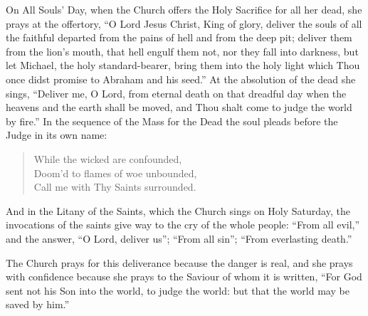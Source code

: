 On All Souls' Day, when the Church offers the Holy Sacrifice for all her dead, she prays at the offertory, ``O Lord Jesus Christ, King of glory, deliver the souls of all the faithful departed from the pains of hell and from the deep pit; deliver them from the lion's mouth, that hell engulf them not, nor they fall into darkness, but let Michael, the holy standard-bearer, bring them into the holy light which Thou once didst promise to Abraham and his seed.'' At the absolution of the dead she sings, ``Deliver me, O Lord, from eternal death on that dreadful day when the heavens and the earth shall be moved, and Thou shalt come to judge the world by fire.'' In the sequence of the Mass for the Dead the soul pleads before the Judge in its own name:

\begin{quote}

\medskip
While the wicked are confounded,\\
Doom'd to flames of woe unbounded,\\
Call me with Thy Saints surrounded.
\end{quote}

\noindent And in the Litany of the Saints, which the Church sings on Holy Saturday, the invocations of the saints give way to the cry of the whole people: ``From all evil,'' and the answer, ``O Lord, deliver us''; ``From all sin''; ``From everlasting death.''

The Church prays for this deliverance because the danger is real, and she prays with confidence because she prays to the Saviour of whom it is written, ``For God sent not his Son into the world, to judge the world: but that the world may be saved by him.''


